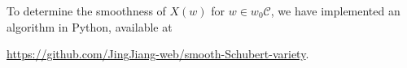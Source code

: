 \documentclass[11pt, reqno]{amsart}
\theoremstyle{definition}
\numberwithin{equation}{section}
\begin{document}
To determine the smoothness of $X(w)$ for $w\in w_0\mathcal{C}$, we have implemented an algorithm in Python, available at
\begin{center}
\url{https://github.com/JingJiang-web/smooth-Schubert-variety}.
\end{center}





\end{document}

